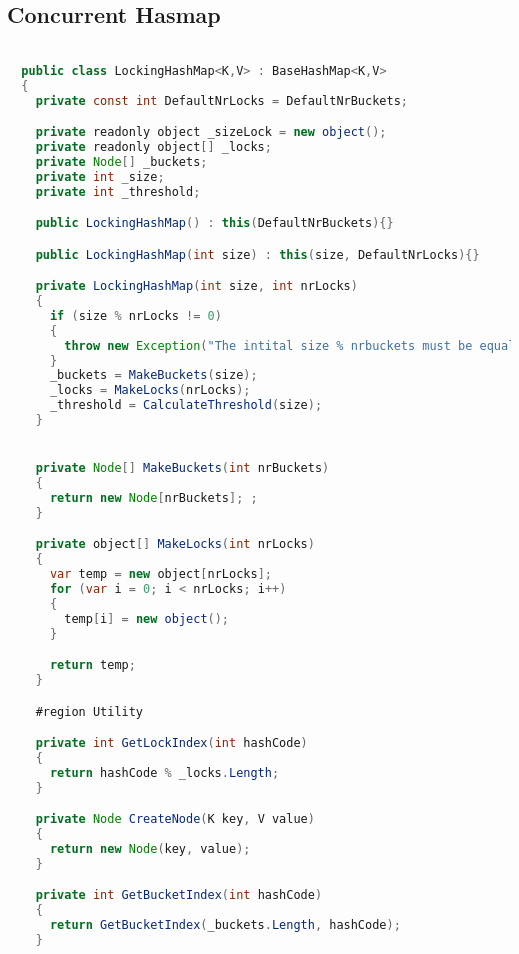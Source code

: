\subsection{Concurrent Hasmap}
\begin{lstlisting}[label=lst:impl_hashmap_lock,
  caption={Lock based Concurrent Hasmap Implementation},
  language=Java,  
  showspaces=false,
  showtabs=false,
  breaklines=true,
  showstringspaces=false,
  breakatwhitespace=true,
  commentstyle=\color{greencomments},
  keywordstyle=\color{bluekeywords},
  stringstyle=\color{redstrings},
  escapechar=~,
  morekeywords={atomic, retry, orelse, var, get, set, ref, out, readonly, virtual, override, region, endregion, foreach}]  % Start your code-block

  public class LockingHashMap<K,V> : BaseHashMap<K,V>
  {
    private const int DefaultNrLocks = DefaultNrBuckets;

    private readonly object _sizeLock = new object();
    private readonly object[] _locks;
    private Node[] _buckets;
    private int _size;
    private int _threshold;

    public LockingHashMap() : this(DefaultNrBuckets){}

    public LockingHashMap(int size) : this(size, DefaultNrLocks){}

    private LockingHashMap(int size, int nrLocks)
    {
      if (size % nrLocks != 0)
      {
        throw new Exception("The intital size % nrbuckets must be equal to zero");
      }
      _buckets = MakeBuckets(size);
      _locks = MakeLocks(nrLocks);
      _threshold = CalculateThreshold(size);
    }


    private Node[] MakeBuckets(int nrBuckets)
    {
      return new Node[nrBuckets]; ;
    }

    private object[] MakeLocks(int nrLocks)
    {
      var temp = new object[nrLocks];
      for (var i = 0; i < nrLocks; i++)
      {
        temp[i] = new object();
      }

      return temp;
    }

    #region Utility

    private int GetLockIndex(int hashCode)
    {
      return hashCode % _locks.Length;
    }

    private Node CreateNode(K key, V value)
    {
      return new Node(key, value);
    }

    private int GetBucketIndex(int hashCode)
    {
      return GetBucketIndex(_buckets.Length, hashCode);
    }


\end{lstlisting}
